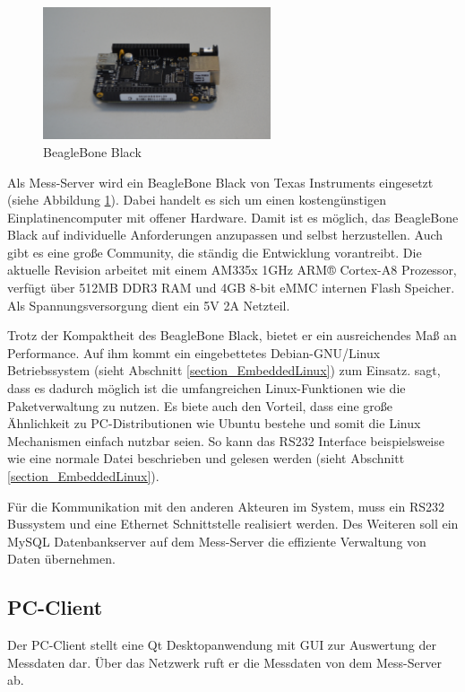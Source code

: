 \begin{figure}[H]
\begin{center}
\includegraphics[width=0.6\textwidth]{img/general/BeagleBoneBlack.png}
\caption{BeagleBone Black}
\label{figure_Beagleboneblack}
\end{center}
\end{figure}


Als Mess-Server wird ein BeagleBone Black von Texas Instruments eingesetzt (siehe Abbildung \ref{figure_Beagleboneblack}). Dabei handelt es sich um einen kostengünstigen Einplatinencomputer mit offener Hardware. Damit ist es möglich, das BeagleBone Black auf individuelle Anforderungen anzupassen und selbst herzustellen. Auch gibt es eine große Community, die ständig die Entwicklung vorantreibt.
Die aktuelle Revision arbeitet mit einem AM335x 1GHz ARM® Cortex-A8 Prozessor, verfügt über 512MB DDR3 RAM und 4GB 8-bit eMMC internen Flash Speicher. Als Spannungsversorgung dient ein 5V 2A Netzteil.

Trotz der Kompaktheit des BeagleBone Black, bietet er ein ausreichendes Maß an Performance. Auf ihm kommt ein eingebettetes Debian-GNU/Linux Betriebssystem (sieht Abschnitt \ref{section_EmbeddedLinux}) zum Einsatz. \cite{schroeder2009embedded} sagt, dass es dadurch möglich ist die umfangreichen Linux-Funktionen wie die Paketverwaltung zu nutzen. Es biete auch den Vorteil, dass eine große Ähnlichkeit zu PC-Distributionen wie Ubuntu bestehe und somit die Linux Mechanismen einfach nutzbar seien. So kann das RS232 Interface beispielsweise wie eine normale Datei beschrieben und gelesen werden (sieht Abschnitt \ref{section_EmbeddedLinux}).

Für die Kommunikation mit den anderen Akteuren im System, muss ein RS232 Bussystem und eine Ethernet Schnittstelle realisiert werden. Des Weiteren soll ein MySQL Datenbankserver auf dem Mess-Server die effiziente Verwaltung von Daten übernehmen.

\subsection{PC-Client}
\label{section_PC-Client}
Der PC-Client stellt eine Qt Desktopanwendung mit \ac{GUI} zur Auswertung der Messdaten dar. Über das Netzwerk ruft er die Messdaten von dem Mess-Server ab. 


